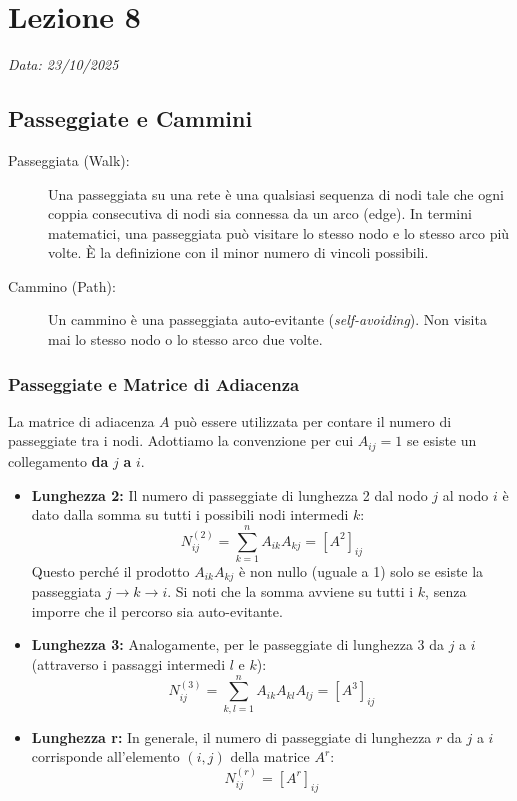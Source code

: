 \chapter{Lezione 8}
\label{chap:lezione_08} 

\begin{flushright}
\textit{Data: 23/10/2025}
\end{flushright}

\section{Passeggiate e Cammini}

	\begin{description}
		\item[Passeggiata (Walk):] Una passeggiata su una rete è una qualsiasi sequenza di nodi tale che ogni coppia consecutiva di nodi sia connessa da un arco (edge). In termini matematici, una passeggiata può visitare lo stesso nodo e lo stesso arco più volte. È la definizione con il minor numero di vincoli possibili.
		
		\item[Cammino (Path):] Un cammino è una passeggiata auto-evitante (\textit{self-avoiding}). Non visita mai lo stesso nodo o lo stesso arco due volte.
	\end{description}
	
	\subsection{Passeggiate e Matrice di Adiacenza}
	La matrice di adiacenza $A$ può essere utilizzata per contare il numero di passeggiate tra i nodi. Adottiamo la convenzione per cui $A_{ij} = 1$ se esiste un collegamento \textbf{da} $j$ \textbf{a} $i$.
	
	\begin{itemize}
		\item \textbf{Lunghezza 2:} Il numero di passeggiate di lunghezza 2 dal nodo $j$ al nodo $i$ è dato dalla somma su tutti i possibili nodi intermedi $k$:
		$$N_{ij}^{(2)} = \sum_{k=1}^{n} A_{ik} A_{kj} = [A^2]_{ij}$$
		Questo perché il prodotto $A_{ik}A_{kj}$ è non nullo (uguale a 1) solo se esiste la passeggiata $j \to k \to i$. Si noti che la somma avviene su tutti i $k$, senza imporre che il percorso sia auto-evitante.
		
		\item \textbf{Lunghezza 3:} Analogamente, per le passeggiate di lunghezza 3 da $j$ a $i$ (attraverso i passaggi intermedi $l$ e $k$):
		$$N_{ij}^{(3)} = \sum_{k,l=1}^{n} A_{ik} A_{kl} A_{lj} = [A^3]_{ij}$$
		
		\item \textbf{Lunghezza r:} In generale, il numero di passeggiate di lunghezza $r$ da $j$ a $i$ corrisponde all'elemento $(i, j)$ della matrice $A^r$:
		$$N_{ij}^{(r)} = [A^r]_{ij}$$
	\end{itemize}
	
